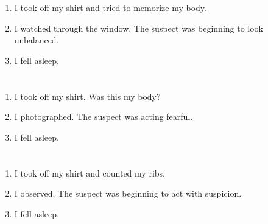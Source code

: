 \documentclass{article}
\begin{document}
    \newpage
    
    \section{}
    
    \begin{enumerate}
    
    \item I took off my shirt and tried to memorize my body.\\
    
    \item I watched through the window. The suspect was beginning to look unbalanced.\\
    
    \item I fell asleep.\\
    
    \end{enumerate}
     
    \newpage
    
    \section{}
    
    \begin{enumerate}
    
    \item I took off my shirt. Was this my body?\\
    
    \item I photographed. The suspect was acting fearful.\\
    
    \item I fell asleep.\\
    
    \end{enumerate}
     
    \newpage
    
    \section{}
    
    \begin{enumerate}
    
    \item I took off my shirt and counted my ribs.\\
    
    \item I observed. The suspect was beginning to act with suspicion.\\
    
    \item I fell asleep.\\
    
    \end{enumerate}
     
\end{document}
